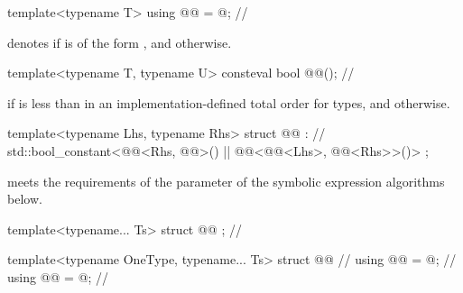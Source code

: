 \begin{codeblock}
template<typename T>
using @@ = @\seebelownc@;  // \expos
\end{codeblock}

\pnum
{} denotes
 if  is of the form , and
 otherwise.

\begin{itemdecl}
template<typename T, typename U>
consteval bool @@();  // \expos
\end{itemdecl}

\begin{itemdescr}
\pnum
\returns
{} if  is less than 
in an implementation-defined total order for types, and
 otherwise.
\end{itemdescr}

\begin{codeblock}
template<typename Lhs, typename Rhs>
struct @@ :  // \expos
    std::bool_constant<@@<Rhs, @@>() ||
                       @@<@@<Lhs>, @@<Rhs>>()> {};
\end{codeblock}

\pnum
{} meets the requirements of
the  parameter of the symbolic expression algorithms below.

\begin{codeblock}
template<typename... Ts>
struct @@ {};      // \expos

template<typename OneType, typename... Ts>
struct @@ {   // \expos
  using @@ = @\seebelownc@;  // \expos
  using @@ = @\seebelownc@;  // \expos
}
\end{codeblock}

